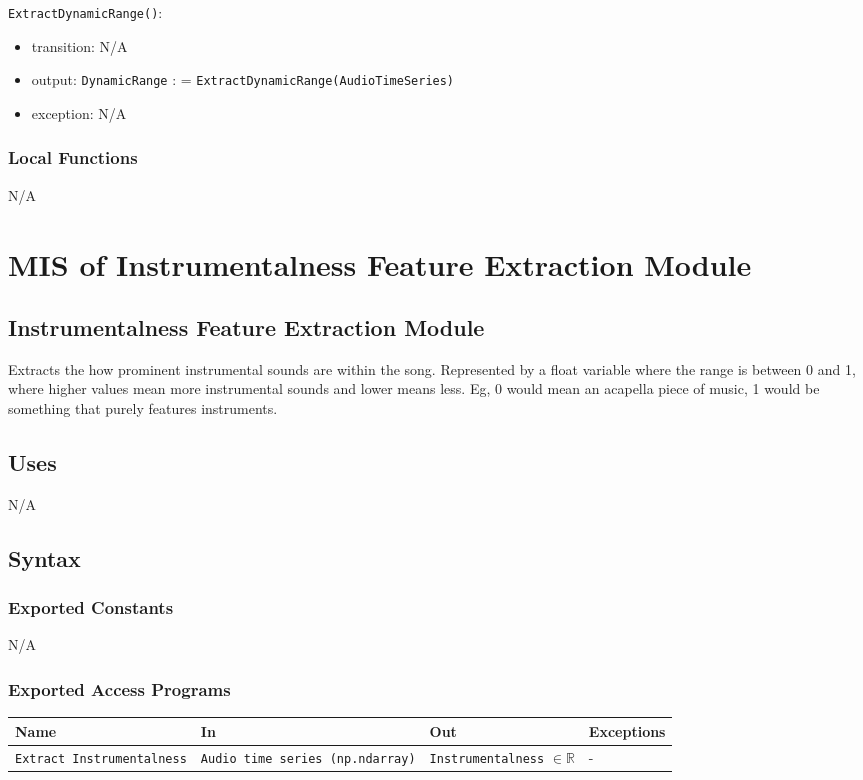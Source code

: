 \documentclass[12pt, titlepage]{article}
\begin{document}
\noindent \texttt{ExtractDynamicRange()}:
\begin{itemize}
\item transition: N/A
\item output: \texttt{Dynamic\textunderscore Range} : = \texttt{ExtractDynamicRange(Audio\textunderscore Time\textunderscore Series)}
\item exception: N/A
\end{itemize}

\subsubsection{Local Functions}
N/A

\section{MIS of Instrumentalness Feature Extraction Module} 

\subsection{Instrumentalness Feature Extraction Module}
Extracts the how prominent instrumental sounds are within the song. Represented by a float
variable where the range is between 0 and 1, where higher values mean more instrumental sounds
and lower means less. Eg, 0 would mean an acapella piece of music, 1 would be something that purely
features instruments.  

\subsection{Uses}
N/A

\subsection{Syntax}

\subsubsection{Exported Constants}
N/A

\subsubsection{Exported Access Programs}

\begin{center}
\begin{tabular}{p{2cm} p{4cm} p{4cm} p{2cm}}
\hline
\textbf{Name} & \textbf{In} & \textbf{Out} & \textbf{Exceptions}\\
\hline%
\texttt{Extract Instrumentalness} &\texttt{Audio time series \linebreak\linebreak (np.ndarray)} &\texttt{Instrumentalness} $\in \mathbb{R}$ &-\\
\hline
\end{tabular}
\end{center}
\end{document}
